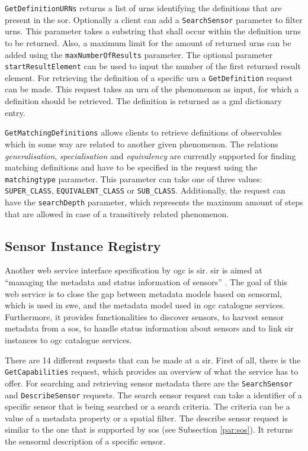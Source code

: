 \begin{sloppypar}
\texttt{GetDefinitionURNs} returns a list of \acp{urn} identifying the definitions that are present in the \ac{sor}. Optionally a client can add a \texttt{SearchSensor} parameter to filter \acp{urn}. This parameter takes a substring that shall occur within the definition \acp{urn} to be returned. Also, a maximum limit for the amount of returned \acp{urn} can be added using the \texttt{maxNumberOfResults} parameter. The optional parameter \texttt{startResultElement} can be used to input the number of the first returned result element. For retrieving the definition of a specific \ac{urn} a \texttt{GetDefinition} request can be made. This request takes an \ac{urn} of the phenomenon as input, for which a definition should be retrieved. The definition is returned as a \ac{gml} dictionary entry. 
\end{sloppypar}

\texttt{GetMatchingDefinitions} allows clients to retrieve definitions of observables which in some way are related to another given phenomenon. The relations \textit{generalisation}, \textit{specialisation} and \textit{equivalency} are currently supported for finding matching definitions \citep{SW:OGC4} and have to be specified in the request using the \texttt{matchingtype} parameter. This parameter can take one of three values: \texttt{SUPER\_CLASS}, \texttt{EQUIVALENT\_CLASS} or \texttt{SUB\_CLASS}. Additionally, the request can have the \texttt{searchDepth} parameter, which represents the maximum amount of steps that are allowed in case of a transitively related phenomenon.  

\subsection{Sensor Instance Registry}
\label{par:SIR}
Another web service interface specification by \ac{ogc} is \ac{sir}. \ac{sir} is aimed at \enquote{managing the metadata and status information of sensors} \cite[p. xii]{SW:OGC3}. The goal of this web service is to close the gap between metadata models based on \ac{sensorml}, which is used in \ac{swe}, and the metadata model used in \ac{ogc} catalogue services. Furthermore, it provides functionalities to discover sensors, to harvest sensor metadata from a \ac{sos}, to handle status information about sensors and to link \ac{sir} instances to \ac{ogc} catalogue services. 


There are 14 different requests that can be made at a \ac{sir}. First of all, there is the \texttt{GetCapabilities} request, which provides an overview of what the service has to offer. For searching and retrieving sensor metadata there are the \texttt{SearchSensor} and \texttt{DescribeSensor} requests. The search sensor request can take a identifier of a specific sensor that is being searched or a search criteria. The criteria can be a value of a metadata property or a spatial filter. The describe sensor request is similar to the one that is supported by \ac{sos} (see Subsection \ref{par:sos}). It returns the \ac{sensorml} description of a specific sensor. 

